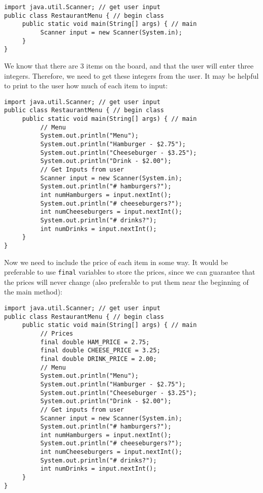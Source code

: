 \begin{lstlisting}
import java.util.Scanner; // get user input
public class RestaurantMenu { // begin class
     public static void main(String[] args) { // main
          Scanner input = new Scanner(System.in);
     }
}
\end{lstlisting}

\noindent We know that there are 3 items on the board, and that the user will enter three integers. Therefore, we need to get these integers from the user. It may be helpful to print to the user how much of each item to input: 

\begin{lstlisting}
import java.util.Scanner; // get user input
public class RestaurantMenu { // begin class
     public static void main(String[] args) { // main
          // Menu
          System.out.println("Menu");
          System.out.println("Hamburger - $2.75");
          System.out.println("Cheeseburger - $3.25");
          System.out.println("Drink - $2.00");
          // Get Inputs from user
          Scanner input = new Scanner(System.in);
          System.out.println("# hamburgers?");
          int numHamburgers = input.nextInt();
          System.out.println("# cheeseburgers?");
          int numCheeseburgers = input.nextInt();
          System.out.println("# drinks?");
          int numDrinks = input.nextInt();
     }
}
\end{lstlisting}

\noindent Now we need to include the price of each item in some way. It would be preferable to use \verb|final| variables to store the prices, since we can guarantee that the prices will never change (also preferable to put them near the beginning of the main method):
\begin{lstlisting}
import java.util.Scanner; // get user input
public class RestaurantMenu { // begin class
     public static void main(String[] args) { // main
          // Prices
          final double HAM_PRICE = 2.75;
          final double CHEESE_PRICE = 3.25;
          final double DRINK_PRICE = 2.00;
          // Menu
          System.out.println("Menu");
          System.out.println("Hamburger - $2.75");
          System.out.println("Cheeseburger - $3.25");
          System.out.println("Drink - $2.00");
          // Get inputs from user
          Scanner input = new Scanner(System.in);
          System.out.println("# hamburgers?");
          int numHamburgers = input.nextInt();
          System.out.println("# cheeseburgers?");
          int numCheeseburgers = input.nextInt();
          System.out.println("# drinks?");
          int numDrinks = input.nextInt();
     }
}
\end{lstlisting}

